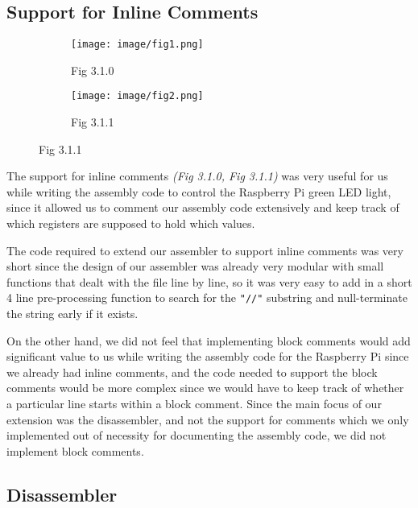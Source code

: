 \documentclass{article}
\begin{document}
        
        \begin{adjustwidth}{2em}{0pt}
    
        \subsection{Support for Inline Comments}
        
            \begin{figure}[h]
            \begin{subfigure}{0.5\textwidth}
            \texttt{[image: image/fig1.png]} 
            \caption{Fig 3.1.0}
            \end{subfigure}
            \begin{subfigure}{0.5\textwidth}
            \texttt{[image: image/fig2.png]}
            \caption{Fig 3.1.1}
            \end{subfigure}
            \end{figure}
        
            The support for inline comments \textit{(Fig 3.1.0, Fig 3.1.1)} was very useful for us while writing the assembly code to control the Raspberry Pi green LED light, since it allowed us to comment our assembly code extensively and keep track of which registers are supposed to hold which values. 
            
            The code required to extend our assembler to support inline comments was very short since the design of our assembler was already very modular with small functions that dealt with the file line by line, so it was very easy to add in a short 4 line pre-processing function to search for the \texttt{"//"} substring and null-terminate the string early if it exists. 
            
            On the other hand, we did not feel that implementing block comments would add significant value to us while writing the assembly code for the Raspberry Pi since we already had inline comments, and the code needed to support the block comments would be more complex since we would have to keep track of whether a particular line starts within a block comment. Since the main focus of our extension was the disassembler, and not the support for comments which we only implemented out of necessity for documenting the assembly code, we did not implement block comments.
        
        
        \subsection{Disassembler}
    

\end{adjustwidth}
\end{document}

